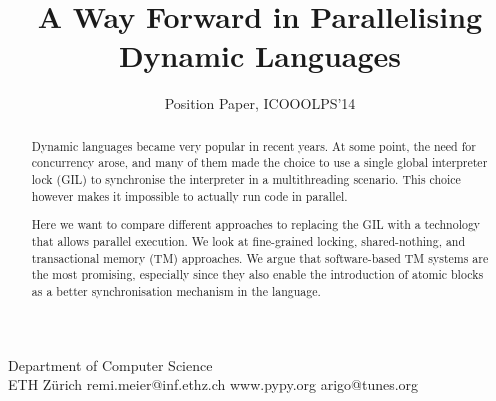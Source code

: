 \documentclass{sigplanconf}
\begin{document}
\setlength{\pdfpageheight}{\paperheight}
\setlength{\pdfpagewidth}{\paperwidth}






\title{A Way Forward in Parallelising Dynamic Languages}
\subtitle{Position Paper, ICOOOLPS'14}

           {Department of Computer Science\\ ETH Zürich}
           {remi.meier@inf.ethz.ch}
           {www.pypy.org}
           {arigo@tunes.org}

\maketitle

\begin{abstract}
  Dynamic languages became very popular in recent years. At some
  point, the need for concurrency arose, and many of them made the
  choice to use a single global interpreter lock (GIL) to synchronise
  the interpreter in a multithreading scenario. This choice however
  makes it impossible to actually run code in parallel.

  Here we want to compare different approaches to replacing the GIL
  with a technology that allows parallel execution. We look at
  fine-grained locking, shared-nothing, and transactional memory (TM)
  approaches. We argue that software-based TM systems are the most
  promising, especially since they also enable the introduction of
  atomic blocks as a better synchronisation mechanism in the language.
\end{abstract}
\end{document}
